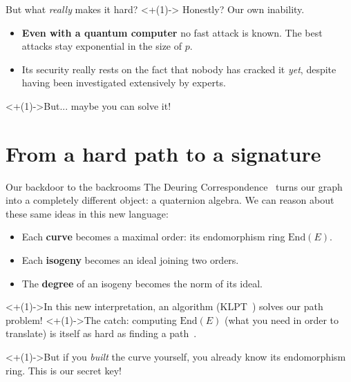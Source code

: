 \documentclass[10pt,aspectratio=169]{beamer}
\begin{document}
\begin{frame}{But what \emph{really} makes it hard?}
  \onslide<+(1)->{
  Honestly? \alert{Our own inability.}}
  \begin{itemize}[<+(1)->]
    \item \textbf{Even with a quantum computer} no fast attack is known. The best attacks
          stay exponential in the size of $p$.
    \item Its security really rests on the fact that nobody has cracked it \emph{yet}, despite having been investigated extensively by experts.
  \end{itemize}
  \vspace{0.6em}
  \centering\onslide<+(1)->{\alert{But... maybe you can solve it!}}
\end{frame}

\section{From a hard path to a signature}

\begin{frame}{Our backdoor to the backrooms}
  The \alert{Deuring Correspondence}~\cite{deuring} turns our graph into a completely different object:
  a quaternion algebra.
  We can reason about these same ideas in this new language:
  \begin{itemize}[<+(1)->]
    \item Each \textbf{curve} becomes a \alert{maximal order}: its endomorphism ring $\text{End}(E)$.
    \item Each \textbf{isogeny} becomes an \alert{ideal} joining two orders.
    \item The \textbf{degree} of an isogeny becomes the \alert{norm} of its ideal.
  \end{itemize}
  \vspace{0.8em}
  \onslide<+(1)->{In this new interpretation, an algorithm (\alert{KLPT}~\cite{klpt}) solves our path problem!}
  \onslide<+(1)->{The catch: computing $\text{End}(E)$ (what you need in order to translate) is itself
  \alert{as hard as finding a path}~\cite{wesolowski}.}

  \vspace{0.4em}
  \centering\onslide<+(1)->{But if you \emph{built} the curve yourself, you already know its endomorphism ring.
  \alert{This is our secret key!}}
\end{frame}
\end{document}
